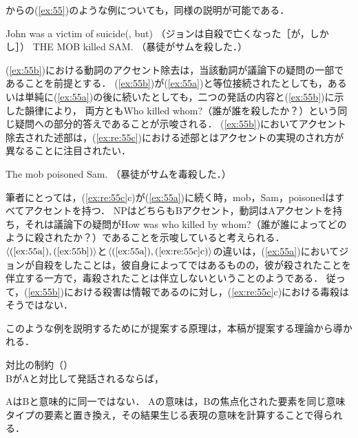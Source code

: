 \documentclass{goken}
\newcommand{\ori}[1]{\noindent\textcolor[gray]{0.7}{\fontsize{8pt}{8pt}\selectfont{\textsf{(p.~#1)}}} }
\begin{document}
\citealt{Schwarzschild1994a}からの(\ref{ex:55})のような例についても，同様の説明が可能である．

\begin{exe}
	\ex\label{ex:55}
  \begin{xlist}
    \ex\label{ex:55a}
    John was a victim of suicide(, but) （ジョンは自殺で亡くなった［が，しかし］）
    \ex\label{ex:55b}
    THE MOB killed SAM. （暴徒がサムを殺した．）
  \end{xlist}
\end{exe}

\noindent
(\ref{ex:55b})における動詞のアクセント除去は，当該動詞が議論下の疑問の一部であることを前提とする．
(\ref{ex:55b})が(\ref{ex:55a})と等位接続されたとしても，あるいは単純に(\ref{ex:55a})の後に続いたとしても，二つの発話の内容と(\ref{ex:55b})に示した韻律により，\ori{53}両方ともWho killed whom?（誰が誰を殺したか？）という同じ疑問への部分的答えであることが示唆される．
(\ref{ex:55b})においてアクセント除去された述部は，(\ref{ex:re:55c})における述部とはアクセントの実現のされ方が異なることに注目されたい．

\setcounter{exx}{54}
\begin{exe}
	\ex\label{ex:re:55}
  \begin{xlist}
    \label{ex:re:55c}
    The mob poisoned Sam. （暴徒がサムを毒殺した．）
  \end{xlist}
\end{exe}

\noindent
筆者にとっては，(\ref{ex:re:55c}c)が(\ref{ex:55a})に続く時，mob，Sam，poisonedはすべてアクセントを持つ．
NPはどちらもBアクセント，動詞はAアクセントを持ち，それは議論下の疑問がHow was who killed by whom?（誰が誰によってどのように殺されたか？）であることを示唆していると考えられる．
$\langle(\text{\ref{ex:55a}}), (\text{\ref{ex:55b}})\rangle$と$\langle(\text{\ref{ex:55a}}), (\text{\ref{ex:re:55c}c})\rangle$の違いは，(\ref{ex:55a})においてジョンが自殺をしたことは，彼自身によってではあるものの，彼が殺されたことを伴立する一方で，毒殺されたことは伴立しないということのようである．
従って，(\ref{ex:55b})における殺害は情報であるのに対し，(\ref{ex:re:55c}c)における毒殺はそうではない．

このような例を説明するために\citeauthor{Schwarzschild1994a}が提案する原理は，本稿が提案する理論から導かれる．

\setcounter{exx}{55}
\begin{exe}
	\ex\label{ex:56} 対比の制約（\citealt{Schwarzschild1994a}）\\
%
  BがAと対比して発話されるならば，
  \begin{xlist}
    \ex\label{ex:56a}
    AはBと意味的に同一ではない．
    \ex\label{ex:56b}
    Aの意味は，Bの焦点化された要素を同じ意味タイプの要素と置き換え，その結果生じる表現の意味を計算することで得られる．
  \end{xlist}
\end{exe}
\end{document}
